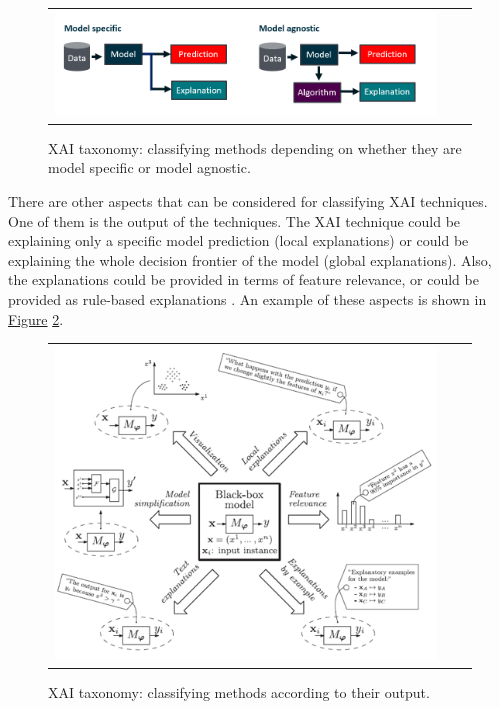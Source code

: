 \begin{figure}[h!]
\centering
 \begin{tabular}{c@{\qquad}c@{\qquad}c}
\includegraphics[width=0.8\columnwidth]{figures/XAI_specific_vs_agnostic.PNG}
  \end{tabular} 
  \caption{XAI taxonomy: classifying methods depending on whether they are model specific or model agnostic.\label{fig:XAIspecificVSagnostic}}
\end{figure}

There are other aspects that can be considered for classifying XAI techniques. One of them is the output of the techniques. The XAI technique could be explaining only a specific model prediction (local explanations) or could be explaining the whole decision frontier of the model (global explanations). Also, the explanations could be provided in terms of feature relevance, or could be provided as rule-based explanations \parencite{arrieta2020explainable}. An example of these aspects is shown in \hyperref[fig:XAIapproaches]{Figure} \ref{fig:XAIapproaches}.

\begin{figure}[h!]
\centering
 \begin{tabular}{c@{\qquad}c@{\qquad}c}
\includegraphics[width=0.6\columnwidth]{figures/XAI_Approaches.PNG}
  \end{tabular} 
  \caption{XAI taxonomy: classifying methods according to their output. \parencite{arrieta2020explainable}\label{fig:XAIapproaches}}
\end{figure}

